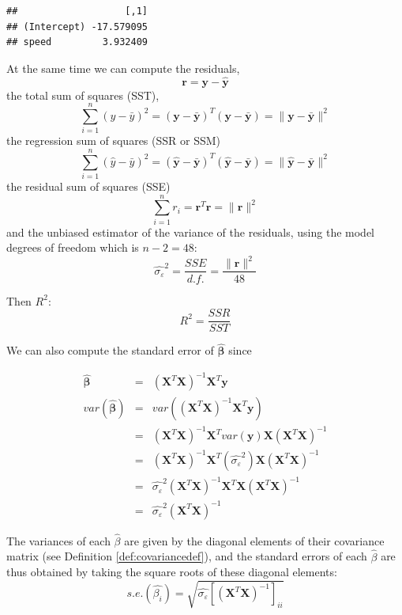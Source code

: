 \documentclass[
]{article}
\theoremstyle{definition}
\theoremstyle{definition}
\theoremstyle{definition}
\theoremstyle{definition}
\theoremstyle{remark}
\begin{document}
\begin{verbatim}
##                   [,1]
## (Intercept) -17.579095
## speed         3.932409
\end{verbatim}

At the same time we can compute the residuals,
\[\mathbf{r}=\mathbf{y}-\mathbf{\hat{y}}\]
the total sum of squares (SST),
\[\sum_{i=1}^n (y-\bar{y})^2=(\mathbf{y}-\mathbf{\bar{y}})^T(\mathbf{y}-\mathbf{\bar{y}})=\|\mathbf{y}-\mathbf{\bar{y}}\|^2\]
the regression sum of squares (SSR or SSM)
\[\sum_{i=1}^n (\hat{y}-\bar{y})^2=(\mathbf{\hat{y}}-\mathbf{\bar{y}})^T(\mathbf{\hat{y}}-\mathbf{\bar{y}})=\|\mathbf{\hat{y}}-\mathbf{\bar{y}}\|^2\]
the residual sum of squares (SSE)
\[\sum_{i=1}^n r_i =\mathbf{r}^T\mathbf{r}=\|\mathbf{r}\|^2\]
and the unbiased estimator of the variance of the residuals, using the model degrees of freedom which is \(n-2=48\):
\[\widehat{\sigma_{\varepsilon}}^2 =\frac{SSE}{d.f.} = \frac{\|\mathbf{r}\|^2}{48}\]

Then \(R^2\):
\[R^2 = \frac{SSR}{SST}\]

We can also compute the standard error of \(\widehat{\boldsymbol\beta}\) since

\begin{eqnarray*}
\widehat{\boldsymbol\beta} &=& (\mathbf{X}^T\mathbf{X})^{-1}\mathbf{X}^T\mathbf{y}\\
var(\widehat{\boldsymbol\beta})&=&var((\mathbf{X}^T\mathbf{X})^{-1}\mathbf{X}^T\mathbf{y})\\
 &=&(\mathbf{X}^T\mathbf{X})^{-1}\mathbf{X}^T var(\mathbf{y}) \mathbf{X}(\mathbf{X}^T\mathbf{X})^{-1} \\
 &=&(\mathbf{X}^T\mathbf{X})^{-1}\mathbf{X}^T (\widehat{\sigma_{\varepsilon}}^2) \mathbf{X}(\mathbf{X}^T\mathbf{X})^{-1} \\
  &=& \widehat{\sigma_{\varepsilon}}^2 (\mathbf{X}^T\mathbf{X})^{-1}\mathbf{X}^T\mathbf{X}(\mathbf{X}^T\mathbf{X})^{-1} \\
  &=& \widehat{\sigma_{\varepsilon}}^2(\mathbf{X}^T\mathbf{X})^{-1}
\end{eqnarray*}

The variances of each \(\widehat\beta\) are given by the diagonal elements of their covariance matrix (see Definition \ref{def:covariancedef}), and the standard errors of each \(\widehat\beta\) are thus obtained by taking the square roots of these diagonal elements:
\[s.e.(\widehat{\beta_i})=\sqrt{\widehat{\sigma_{\varepsilon}}[(\mathbf{X}^T\mathbf{X})^{-1}]_{ii}}\]
\end{document}
